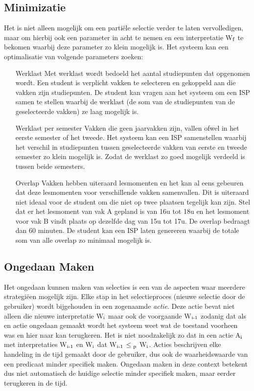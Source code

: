 \subsection{Minimizatie}
Het is niet alleen mogelijk om een parti\"{e}le selectie verder te laten vervolledigen, maar om hierbij ook een parameter in acht te nemen en een interpretatie W$\textsubscript{f}$ te bekomen waarbij deze parameter zo klein mogelijk is. Het systeem kan een optimalisatie van volgende parameters zoeken:
\begin{itemize}
\item[Werklast] Met werklast wordt bedoeld het aantal studiepunten dat opgenomen wordt. Een student is verplicht vakken te selecteren en gekoppeld aan die vakken zijn studiepunten. De student kan vragen aan het systeem om een ISP samen te stellen waarbij de werklast (de som van de studiepunten van de geselecteerde vakken) ze laag mogelijk is.
\item[Werklast per semester] Vakken die geen jaarvakken zijn, vallen ofwel in het eerste semester of het tweede. Het systeem kan een ISP samenstellen waarbij het verschil in studiepunten tussen geselecteerde vakken van eerste en tweede semester zo klein mogelijk is. Zodat de werklast zo goed mogelijk verdeeld is tussen beide semesters.
\item[Overlap] Vakken hebben uiteraard lesmomenten en het kan al eens gebeuren dat deze lesmomenten voor verschillende vakken samenvallen. Dit is uiteraard niet ideaal voor de student om die niet op twee plaatsen tegelijk kan zijn. Stel dat er het lesmoment van vak A gepland is van 16u tot 18u en het lesmoment voor vak B vindt plaats op dezelfde dag van 15u tot 17u. De overlap bedraagt dan 60 minuten. De student kan een ISP laten genereren waarbij de totale som van alle overlap zo minimaal mogelijk is. 
\end{itemize}

\subsection{Ongedaan Maken}
Het ongedaan kunnen maken van selecties is een van de aspecten waar meerdere strategi\"{e}en mogelijk zijn. Elke stap in het selectieproces (nieuwe selectie door de gebruiker) wordt bijgehouden in een zogenaamde \emph{actie}. Deze actie bevat niet alleen die nieuwe interpretatie W$\textsubscript{i}$ maar ook de voorgaande W$\textsubscript{i-1}$ zodanig dat als en actie ongedaan gemaakt wordt het systeem weet wat de toestand voorheen was en hier naar kan terugkeren. Het is niet noodzakelijk zo dat in een actie A$\textsubscript{i}$ met interpretaties W$\textsubscript{i-1}$ en W$\textsubscript{i}$ dat W$\textsubscript{i-1}$ $\leq\textsubscript{p}$ W$\textsubscript{i}$. Acties beschrijven elke handeling in de tijd gemaakt door de gebruiker, dus ook de waarheidswaarde van een predicaat minder specifiek maken. Ongedaan maken in deze context betekent dus niet automatisch de huidige selectie minder specifiek maken, maar eerder terugkeren in de tijd.

